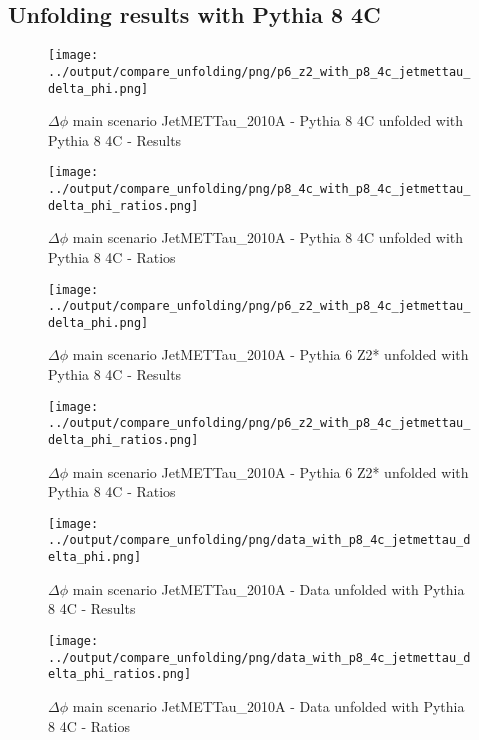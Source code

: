 \documentclass[11pt]{book}
\begin{document}
\clearpage
\subsection{Unfolding results with Pythia 8 4C}

\begin{figure}[ht]
\centering
\texttt{[image: ../output/compare\_unfolding/png/p6\_z2\_with\_p8\_4c\_jetmettau\_delta\_phi.png]}
\caption{$\Delta\phi$ main scenario JetMETTau\_2010A - Pythia 8 4C unfolded with Pythia 8 4C - Results}
\label{p8_p8_jetmettau_delta_phi_a}
\end{figure}

\begin{figure}[ht]
\centering
\texttt{[image: ../output/compare\_unfolding/png/p8\_4c\_with\_p8\_4c\_jetmettau\_delta\_phi\_ratios.png]}
\caption{$\Delta\phi$ main scenario JetMETTau\_2010A - Pythia 8 4C unfolded with Pythia 8 4C - Ratios}
\label{p8_p8_jetmettau_delta_phi_b}
\end{figure}


\begin{figure}[ht]
\centering
\texttt{[image: ../output/compare\_unfolding/png/p6\_z2\_with\_p8\_4c\_jetmettau\_delta\_phi.png]}
\caption{$\Delta\phi$ main scenario JetMETTau\_2010A - Pythia 6 Z2* unfolded with Pythia 8 4C - Results}
\label{p6_p8_jetmettau_delta_phi_a}
\end{figure}

\begin{figure}[ht]
\centering
\texttt{[image: ../output/compare\_unfolding/png/p6\_z2\_with\_p8\_4c\_jetmettau\_delta\_phi\_ratios.png]}
\caption{$\Delta\phi$ main scenario JetMETTau\_2010A - Pythia 6 Z2* unfolded with Pythia 8 4C - Ratios}
\label{p6_p8_jetmettau_delta_phi_b}
\end{figure}

\begin{figure}[ht]
\centering
\texttt{[image: ../output/compare\_unfolding/png/data\_with\_p8\_4c\_jetmettau\_delta\_phi.png]}
\caption{$\Delta\phi$ main scenario JetMETTau\_2010A - Data unfolded with Pythia 8 4C - Results}
\label{data_p8_jetmettau_delta_phi_a}
\end{figure}

\begin{figure}[ht]
\centering
\texttt{[image: ../output/compare\_unfolding/png/data\_with\_p8\_4c\_jetmettau\_delta\_phi\_ratios.png]}
\caption{$\Delta\phi$ main scenario JetMETTau\_2010A - Data unfolded with Pythia 8 4C - Ratios}
\label{data_p8_jetmettau_delta_phi_b}
\end{figure}
\end{document}
